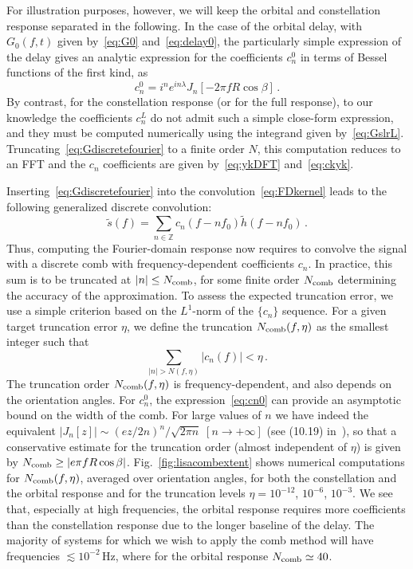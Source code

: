 \documentclass[aps,showpacs,twocolumn,
prd,superscriptaddress,nofootinbib]{revtex4-1}
\newcommand{\be}{\begin{equation}}
\newcommand{\ee}{\end{equation}}
\newcommand{\Hz}{\,\mathrm{Hz}}
\begin{document}
For illustration purposes, however, we will keep the orbital and constellation response separated in the following. In the case of the orbital delay, with $G_{0}(f,t)$ given by~\eqref{eq:G0} and~\eqref{eq:delay0}, the particularly simple expression of the delay gives an analytic expression for the coefficients $c_{n}^{0}$ in terms of Bessel functions of the first kind, as
\be\label{eq:cn0}
	c_{n}^{0} = i^{n} e^{i n \lambda} J_{n} \left[ -2 \pi f R \cos \beta \right]\,.
\ee
By contrast, for the constellation response (or for the full response), to our knowledge the coefficients $c_{n}^{L}$ do not admit such a simple close-form expression, and they must be computed numerically using the integrand given by~\eqref{eq:GslrL}. Truncating~\eqref{eq:Gdiscretefourier} to a finite order $N$, this computation reduces to an FFT and the $c_{n}$ coefficients are given by~\eqref{eq:ykDFT} and~\eqref{eq:ckyk}. 

Inserting~\eqref{eq:Gdiscretefourier} into the convolution~\eqref{eq:FDkernel} leads to the following generalized discrete convolution:
\be\label{eq:transferdiscreteconvolution}
	\tilde{s}(f) = \sum_{n \in \mathbb{Z}} c_{n}(f - n f_{0}) \tilde{h} (f - n f_{0}) \,.
\ee
Thus, computing the Fourier-domain response now requires to convolve the signal with a discrete comb with frequency-dependent coefficients $c_{n}$. In practice, this sum is to be truncated at $|n|\leq N_{\rm comb}$, for some finite order $N_{\rm comb}$ determining the accuracy of the approximation. To assess the expected truncation error, we use a simple criterion based on the $L^{1}$-norm of the $\{c_{n}\}$ sequence. For a given target truncation error $\eta$, we define the truncation $N_{\rm comb}(f, \eta)$ as the smallest integer such that 
\be\label{eq:criteriontruncationcomb}
	\sum_{|n| > N(f, \eta)} |c_{n}(f)| < \eta \,.
\ee
The truncation order $N_{\rm comb}(f,\eta)$ is frequency-dependent, and also depends on the orientation angles. For $c_{n}^{0}$, the expression~\eqref{eq:cn0} can provide an asymptotic bound on the width of the comb. For large values of $n$ we have indeed the equivalent $| J_{n}[z] | \sim (e z/2n)^{n}/\sqrt{2\pi n} \; \left[ n\rightarrow + \infty \right]$ (see (10.19) in~\cite{DLMF}), so that a conservative estimate for the truncation order (almost independent of $\eta$) is given by $N_{\rm comb} \geq  |e \pi f R \cos \beta|$. Fig.~\ref{fig:lisacombextent} shows numerical computations for $N_{\rm comb}(f,\eta)$, averaged over orientation angles, for both the constellation and the orbital response and for the truncation levels  $\eta=10^{-12}$, $10^{-6}$, $10^{-3}$. We see that, especially at high frequencies, the orbital response requires more coefficients than the constellation response due to the longer baseline of the delay. The majority of systems for which we wish to apply the comb method will have frequencies $\lesssim 10^{-2}\Hz$, where for the orbital response $N_{\rm comb} \simeq 40$.
\end{document}
